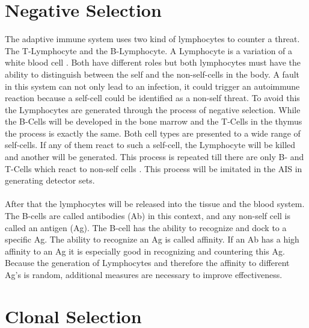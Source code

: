 \section{Negative Selection}

The adaptive immune system uses two kind of lymphocytes to counter a threat. The T-Lymphocyte and the B-Lymphocyte. A Lymphocyte is a variation of a white blood cell \cite{immunebio}.  Both have different roles but both lymphocytes must have the ability to distinguish between the self and the non-self-cells in the body. A fault in this system can not only lead to an infection, it could trigger an autoimmune reaction because a self-cell could be identified as a non-self threat. To avoid this the Lymphocytes are generated through the process of negative selection. While the B-Cells will be developed in the bone marrow and the T-Cells in the thymus the process is exactly the same. Both cell types are presented to a wide range of self-cells. If any of them react to such a self-cell, the Lymphocyte will be killed and another will be generated. This process is repeated till there are only B- and T-Cells which react to non-self cells \cite{tan2016artificial}. This process will be imitated in the AIS in generating detector sets.
\\\\
After that the lymphocytes will be released into the tissue and the blood system. The B-cells are called antibodies (Ab) in this context, and any non-self cell is called an antigen (Ag). The B-cell has the ability to recognize and dock to a specific Ag. The ability to recognize an Ag is called affinity. If an Ab has a high affinity to an Ag it is especially good in recognizing and countering this Ag. Because the generation of Lymphocytes and therefore the affinity to different Ag’s is random, additional measures are necessary to improve effectiveness.

\section{Clonal Selection}

